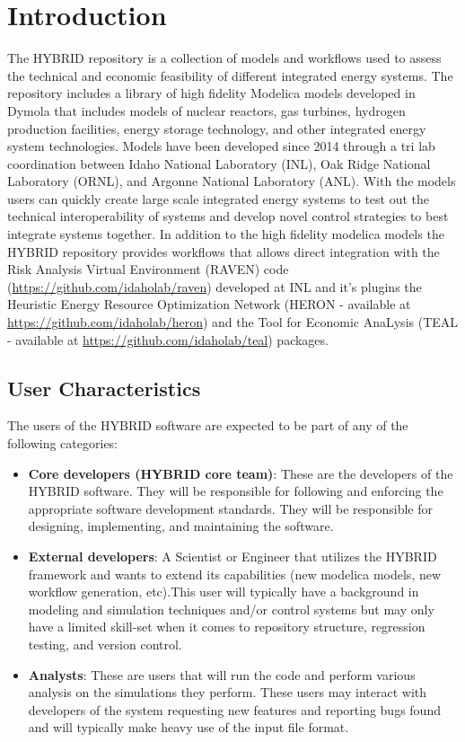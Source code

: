 \section{Introduction}

The HYBRID repository is a collection of models and workflows used to assess the technical and economic
feasibility of different integrated energy systems. The repository includes a library of high fidelity
Modelica models developed in Dymola that includes models of nuclear reactors, gas turbines, hydrogen
production facilities, energy storage technology, and other integrated energy system technologies. Models
have been developed since 2014 through a tri lab coordination between Idaho National Laboratory (INL),
Oak Ridge National Laboratory (ORNL), and Argonne National Laboratory (ANL). With the models users can
quickly create large scale integrated energy systems to test out the technical interoperability of systems and
develop novel control strategies to best integrate systems together. In addition to the high fidelity modelica
models the HYBRID repository provides workflows that allows direct integration with the Risk Analysis Virtual
Environment (RAVEN) code (\url{https://github.com/idaholab/raven}) developed at INL and it’s plugins the Heuristic Energy Resource Optimization Network
(HERON -  available at \url{https://github.com/idaholab/heron}) and the Tool for Economic AnaLysis (TEAL -  available at \url{https://github.com/idaholab/teal}) packages.


\subsection{User Characteristics}

The users of the HYBRID software are expected to be part of any of the following categories:
\begin{itemize}
  \item \textbf{Core developers (HYBRID core team)}: These are the developers of the HYBRID software. They will be responsible for following and enforcing the appropriate software development standards. They will be responsible for designing, implementing, and maintaining the software.
  
  \item \textbf{External developers}: A Scientist or Engineer that utilizes the HYBRID framework and wants to extend its capabilities (new modelica models, new workflow generation, etc).This user will typically have a background in modeling and simulation techniques and/or control systems but may only have a limited skill-set when it comes to repository structure, regression testing, and version control.
  
  \item \textbf{Analysts}:  These are users that will run the code and perform various analysis on the simulations they perform. These users may interact with developers of the system requesting new features and reporting bugs found and will typically make heavy use of the input file format.
\end{itemize}
